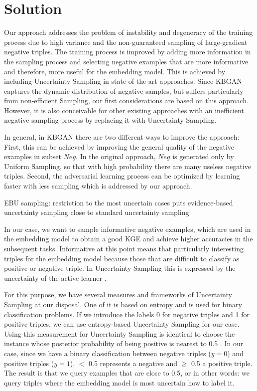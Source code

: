 \chapter{Solution}
\label{ch:solution}

Our approach addresses the problem of instability and degeneracy of the training process due to high variance and the non-guaranteed sampling of large-gradient negative triples.
The training process is improved by adding more information in the sampling process and selecting negative examples that are more informative and therefore, more useful for the embedding model.
This is achieved by including Uncertainty Sampling in state-of-the-art approaches.
Since \ac{KBGAN} captures the dynamic distribution of negative samples, but suffers particularly from non-efficient Sampling, our first considerations are based on this approach.
However, it is also conceivable for other existing approaches with an inefficient negative sampling process by replacing it with Uncertainty Sampling.

In general, in \ac{KBGAN} there are two different ways to improve the approach:
First, this can be achieved by improving the general quality of the negative examples in subset $Neg$.
In the original approach, $Neg$ is generated only by Uniform Sampling, so that with high probability there are many useless negative triples.
Second, the adversarial learning process can be optimized by learning faster with less sampling which is addressed by our approach.

\ac{EBU} sampling:
restriction to the most uncertain cases puts evidence-based uncertainty sampling close to standard uncertainty sampling


In our case, we want to sample informative negative examples, which are used in the embedding model to obtain a good \ac{KGE} and achieve higher accuracies in the subsequent tasks. 
Informative at this point means that  particularly interesting triples for the embedding model because those that are difficult to classify as positive or negative triple.
In Uncertainty Sampling this is expressed by the uncertainty of the active learner \cite{Settles2009ActiveLL}.

For this purpose, we have several measures and frameworks of Uncertainty Sampling at our disposal.
One of it is based on entropy and is used for binary classification problems.
If we introduce the labels 0 for negative triples and 1 for positive triples, we can use entropy-based Uncertainty Sampling for our case.
Using this measurement for Uncertainty Sampling is identical to choose the instance whose posterior probability of being positive is nearest to 0.5 \cite{Settles2009ActiveLL}.
In our case, since we have a binary classification between negative triples ($y=0$) and positive triples ($y=1$), $<$ 0.5 represents a negative and $\geq$ 0.5 a positive triple.
The result is that we query examples that are close to 0.5, or in other words: 
we query triples where the embedding model is most uncertain how to label it.

